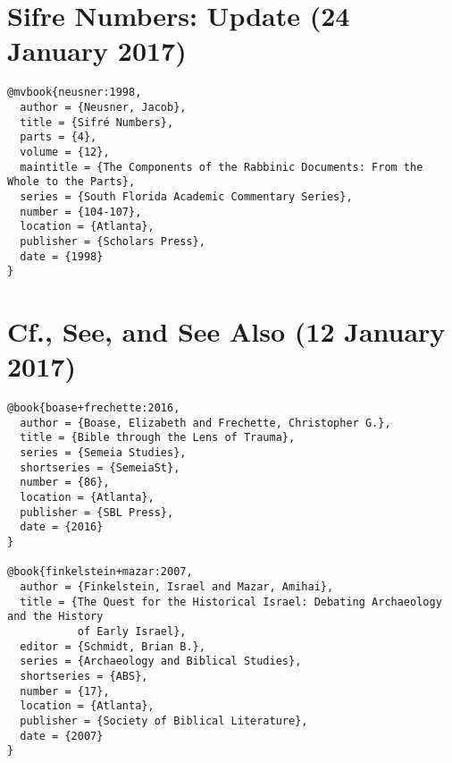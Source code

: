 \documentclass[a4paper]{article}
\begin{document}
\exampleabbreviations
{}

\section{Sifre Numbers: Update (24 January 2017)}

\begin{verbatim}
@mvbook{neusner:1998,
  author = {Neusner, Jacob},
  title = {Sifré Numbers},
  parts = {4},
  volume = {12},
  maintitle = {The Components of the Rabbinic Documents: From the Whole to the Parts},
  series = {South Florida Academic Commentary Series},
  number = {104-107},
  location = {Atlanta},
  publisher = {Scholars Press},
  date = {1998}
}
\end{verbatim}

\begin{verbcite}
  \nocite{neusner:1998}
\end{verbcite}
\examplebibliography
{}

\section{Cf., See, and See Also (12 January 2017)}

\begin{verbatim}
@book{boase+frechette:2016,
  author = {Boase, Elizabeth and Frechette, Christopher G.},
  title = {Bible through the Lens of Trauma},
  series = {Semeia Studies},
  shortseries = {SemeiaSt},
  number = {86},
  location = {Atlanta},
  publisher = {SBL Press},
  date = {2016}
}

@book{finkelstein+mazar:2007,
  author = {Finkelstein, Israel and Mazar, Amihai},
  title = {The Quest for the Historical Israel: Debating Archaeology and the History
           of Early Israel},
  editor = {Schmidt, Brian B.},
  series = {Archaeology and Biblical Studies},
  shortseries = {ABS},
  number = {17},
  location = {Atlanta},
  publisher = {Society of Biblical Literature},
  date = {2007}
}
\end{verbatim}

\begin{fverbcite}{2}
  \autocite[For a more recent study of trauma in the Bible,
    see][]{boase+frechette:2016}
\end{fverbcite}
\begin{fverbcite}{7}
  \autocite[This is the position taken here. For an alternative position,
    see][]{finkelstein+mazar:2007}
\end{fverbcite}
\exampleabbreviations
\examplebibliography
{}
\end{document}
